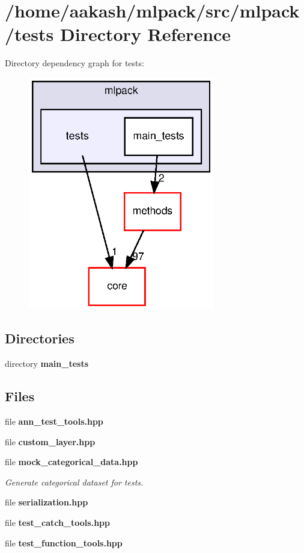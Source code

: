 \section{/home/aakash/mlpack/src/mlpack/tests Directory Reference}
\label{dir_203a7f8a9efb7258e4ba143ee61c484d}
Directory dependency graph for tests\+:
\nopagebreak
\begin{figure}[H]
\begin{center}
\leavevmode
\includegraphics[width=230pt]{dir_203a7f8a9efb7258e4ba143ee61c484d_dep}
\end{center}
\end{figure}
\subsection*{Directories}
\begin{DoxyCompactItemize}
\item 
directory \textbf{ main\+\_\+tests}
\end{DoxyCompactItemize}
\subsection*{Files}
\begin{DoxyCompactItemize}
\item 
file \textbf{ ann\+\_\+test\+\_\+tools.\+hpp}
\item 
file \textbf{ custom\+\_\+layer.\+hpp}
\item 
file \textbf{ mock\+\_\+categorical\+\_\+data.\+hpp}
\begin{DoxyCompactList}\small\item\em Generate categorical dataset for tests. \end{DoxyCompactList}\item 
file \textbf{ serialization.\+hpp}
\item 
file \textbf{ test\+\_\+catch\+\_\+tools.\+hpp}
\item 
file \textbf{ test\+\_\+function\+\_\+tools.\+hpp}
\end{DoxyCompactItemize}
